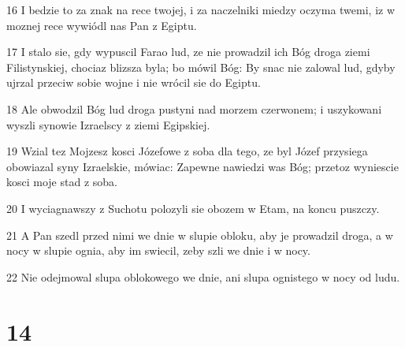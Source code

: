 \par 16 I bedzie to za znak na rece twojej, i za naczelniki miedzy oczyma twemi, iz w moznej rece wywiódl nas Pan z Egiptu.
\par 17 I stalo sie, gdy wypuscil Farao lud, ze nie prowadzil ich Bóg droga ziemi Filistynskiej, chociaz blizsza byla; bo mówil Bóg: By snac nie zalowal lud, gdyby ujrzal przeciw sobie wojne i nie wrócil sie do Egiptu.
\par 18 Ale obwodzil Bóg lud droga pustyni nad morzem czerwonem; i uszykowani wyszli synowie Izraelscy z ziemi Egipskiej.
\par 19 Wzial tez Mojzesz kosci Józefowe z soba dla tego, ze byl Józef przysiega obowiazal syny Izraelskie, mówiac: Zapewne nawiedzi was Bóg; przetoz wyniescie kosci moje stad z soba.
\par 20 I wyciagnawszy z Suchotu polozyli sie obozem w Etam, na koncu puszczy.
\par 21 A Pan szedl przed nimi we dnie w slupie obloku, aby je prowadzil droga, a w nocy w slupie ognia, aby im swiecil, zeby szli we dnie i w nocy.
\par 22 Nie odejmowal slupa oblokowego we dnie, ani slupa ognistego w nocy od ludu.

\chapter{14}

